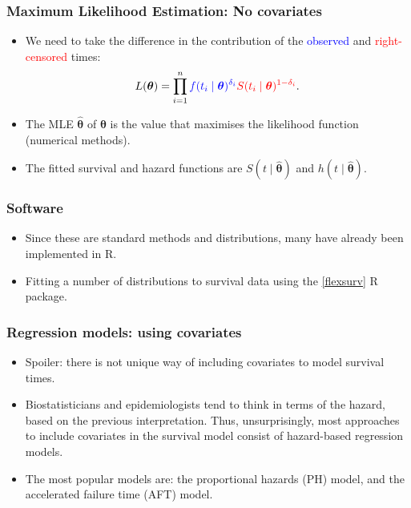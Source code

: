 \documentclass[10pt,handout,compress]{beamer}
\newcommand{\btheta}{\bm{\theta}}
\begin{document}
\begin{frame}
\frametitle{Maximum Likelihood Estimation: No covariates}
\begin{itemize}
\item We need to take the difference in the contribution of the \textcolor{blue}{observed} and \textcolor{red}{right-censored} times: \pause
\begin{eqnarray*}
L(\btheta) = \prod_{i=1}^n \textcolor{blue}{f(t_i \mid \btheta)^{\delta_i}} \textcolor{red}{S(t_i \mid \btheta)^{1-\delta_i}}.
\end{eqnarray*}
\pause
\item The MLE $\widehat{\btheta}$ of $\btheta$ is the value that maximises the likelihood function (numerical methods).
\pause
\item The fitted survival and hazard functions are  $S(t\mid \widehat{\btheta})$ and $h(t\mid \widehat{\btheta})$.
\end{itemize}
\end{frame}


\begin{frame}
\frametitle{Software}
\begin{itemize}
\item Since these are standard methods and distributions, many have already been implemented in R.
\pause
\item Fitting a number of distributions to survival data using the \href{https://cran.r-project.org/web/packages/flexsurv/vignettes/flexsurv.pdf}{[flexsurv]} R package.
\end{itemize}
\end{frame}


\begin{frame}
\frametitle{Regression models: using covariates}
\begin{itemize}
\item Spoiler: there is not unique way of including covariates to model survival times.
\pause
\item Biostatisticians and epidemiologists tend to think in terms of the hazard, based on the previous interpretation. \pause Thus, unsurprisingly, most approaches to include covariates in the survival model consist of hazard-based regression models.
\pause
\item The most popular models are: the proportional hazards (PH) model, and the accelerated failure time (AFT) model.
\end{itemize}
\end{frame}
\end{document}
